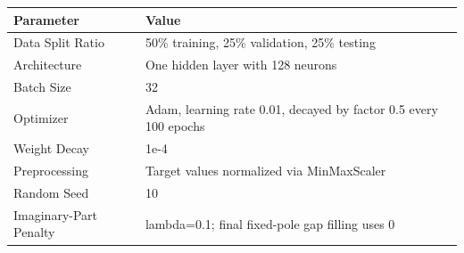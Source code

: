 \begin{tabular}{ll}
Parameter & Value \\
\hline
Data Split Ratio & 50\% training, 25\% validation, 25\% testing \\
Architecture & One hidden layer with 128 neurons \\
Batch Size & 32 \\
Optimizer & Adam, learning rate 0.01, decayed by factor 0.5 every 100 epochs \\
Weight Decay & 1e-4 \\
Preprocessing & Target values normalized via MinMaxScaler \\
Random Seed & 10 \\
Imaginary-Part Penalty & lambda=0.1; final fixed-pole gap filling uses 0 \\
\end{tabular}
